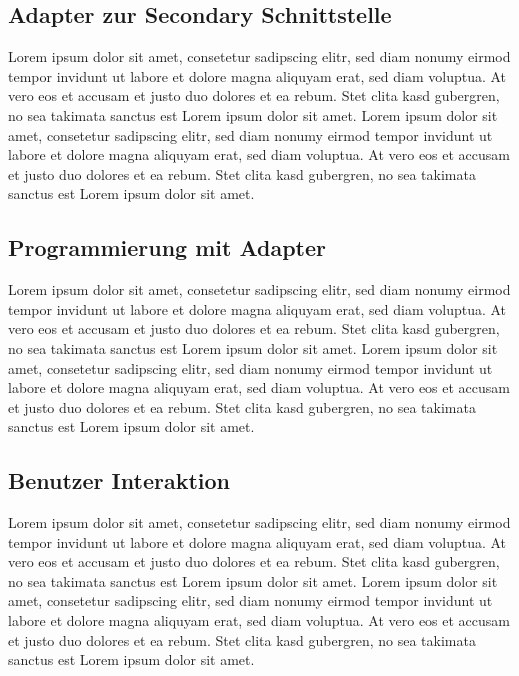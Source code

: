 \subsection{Adapter zur Secondary Schnittstelle}
\label{beschreibung_script_hoeher_schicht}
Lorem ipsum dolor sit amet, consetetur sadipscing elitr, sed diam nonumy eirmod tempor invidunt ut labore et dolore magna aliquyam erat, sed diam voluptua. At vero eos et accusam et justo duo dolores et ea rebum. Stet clita kasd gubergren, no sea takimata sanctus est Lorem ipsum dolor sit amet. Lorem ipsum dolor sit amet, consetetur sadipscing elitr, sed diam nonumy eirmod tempor invidunt ut labore et dolore magna aliquyam erat, sed diam voluptua. At vero eos et accusam et justo duo dolores et ea rebum. Stet clita kasd gubergren, no sea takimata sanctus est Lorem ipsum dolor sit amet.

\subsection{Programmierung mit Adapter}
\label{programmierung_mit_hoerherer_schicht}
Lorem ipsum dolor sit amet, consetetur sadipscing elitr, sed diam nonumy eirmod tempor invidunt ut labore et dolore magna aliquyam erat, sed diam voluptua. At vero eos et accusam et justo duo dolores et ea rebum. Stet clita kasd gubergren, no sea takimata sanctus est Lorem ipsum dolor sit amet. Lorem ipsum dolor sit amet, consetetur sadipscing elitr, sed diam nonumy eirmod tempor invidunt ut labore et dolore magna aliquyam erat, sed diam voluptua. At vero eos et accusam et justo duo dolores et ea rebum. Stet clita kasd gubergren, no sea takimata sanctus est Lorem ipsum dolor sit amet.

\subsection{Benutzer Interaktion}
\label{user_interaktion_mit_hoerherer_schicht}

Lorem ipsum dolor sit amet, consetetur sadipscing elitr, sed diam nonumy eirmod tempor invidunt ut labore et dolore magna aliquyam erat, sed diam voluptua. At vero eos et accusam et justo duo dolores et ea rebum. Stet clita kasd gubergren, no sea takimata sanctus est Lorem ipsum dolor sit amet. Lorem ipsum dolor sit amet, consetetur sadipscing elitr, sed diam nonumy eirmod tempor invidunt ut labore et dolore magna aliquyam erat, sed diam voluptua. At vero eos et accusam et justo duo dolores et ea rebum. Stet clita kasd gubergren, no sea takimata sanctus est Lorem ipsum dolor sit amet.

